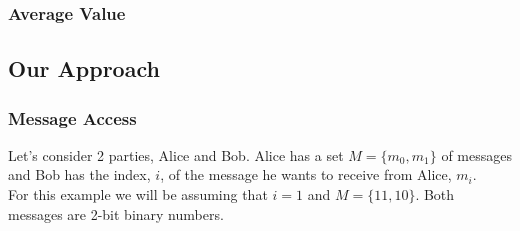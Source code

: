 \subsubsection{Average Value}

\subsection{Our Approach}
\subsubsection{Message Access}
Let's consider 2 parties, Alice and Bob. Alice has a set $M = \{m_0,m_1\}$ of messages and Bob has the index, $i$, of the message he wants to receive from Alice, $m_i$.\\
For this example we will be assuming that $i=1$ and $M = \{11,10\}$. Both messages are 2-bit binary numbers.
